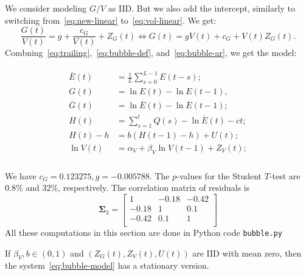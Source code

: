 \documentclass[12pt]{amsart}
\begin{document}
We consider modeling $G/V$ as IID. But we also add the intercept, similarly to switching from~\eqref{eq:new-linear} to~\eqref{eq:vol-linear}. We get:
\begin{equation}
\label{eq:earnings-vol}
\frac{G(t)}{V(t)} = g + \frac{c_G}{V(t)} + Z_G(t) \Leftrightarrow G(t) = gV(t) + c_G + V(t)Z_G(t).
\end{equation}
Combning~\eqref{eq:trailing},~\eqref{eq:bubble-def}, and~\eqref{eq:bubble-ar}, we get the model:

\begin{align}
\label{eq:bubble-model}
\begin{split}
\overline{E}(t) &= \frac1L\sum\limits_{s=0}^{L-1}E(t-s);\\
G(t) &= \ln E(t) - \ln E(t-1),\\
\overline{G}(t) &= \ln\overline{E}(t) - \ln\overline{E}(t-1);\\
H(t) &= \sum\limits_{s=1}^tQ(s)  - \ln\overline{E}(t) - ct;\\
H(t) - h &= b(H(t-1) - h) + U(t);\\
\ln V(t) &= \alpha_V  + \beta_V\ln V(t-1) + Z_V(t);\\
\end{split}
\end{align}

We have $c_G = 0.123275, g = -0.005788$. The $p$-values for the Student $T$-test are $0.8\%$ and $32\%$, respectively. The correlation matrix of residuals is 
$$
\mathbf{\Sigma}_3 = 
\begin{bmatrix}
1 & -0.18 & -0.42\\
-0.18 & 1 & 0.1\\
-0.42 & 0.1 & 1\\
\end{bmatrix}
$$
All these computations in this section are done in Python code \texttt{bubble.py}

\begin{theorem} If $\beta_V, b \in (0, 1)$ and $(Z_G(t), Z_V(t), U(t))$ are IID with mean zero, then the system~\eqref{eq:bubble-model} has a stationary version. 
\end{theorem}
\end{document}
